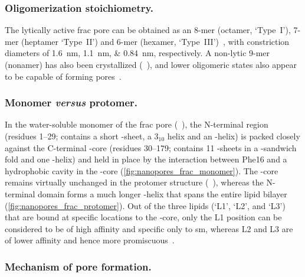 %
\subsubsection{Oligomerization stoichiometry.}
%

The lytically active \gls{frac} pore can be obtained as an 8-mer (octamer, `Type~I'), 7-mer (heptamer
`Type~II') and 6-mer (hexamer, `Type~III')~\cite{Huang-2019}, with constriction diameters of
\SIlist{1.6;1.1;0.84}{\nm}, respectively. A non-lytic 9-mer (nonamer) has also been crystallized
(~\cite{Mechaly-2011}), and lower oligomeric states also appear to be capable of forming
pores~\cite{Rojko-2016}.

%
\subsubsection{Monomer \textit{versus} protomer.}
%

In the water-soluble monomer of the \gls{frac} pore (~\cite{Tanaka-2015}), the N-terminal region
(residues 1--29; contains a short \tb-sheet, a $3_{10}$ helix and an \ta-helix) is packed closely against the
C-terminal \tb-core (residues 30--179; contains 11 \tb-sheets in a \tb-sandwich fold and one \ta-helix) and
held in place by the interaction between Phe16 and a hydrophobic cavity in the \tb-core
(\cref{fig:nanopores_frac_monomer}). The \tb-core remains virtually unchanged in the protomer structure
(~\cite{Tanaka-2015}), whereas the N-terminal domain forms a much longer \ta-helix that spans the
entire lipid bilayer (\cref{fig:nanopores_frac_protomer}). Out of the three lipids (`L1', `L2', and `L3') that
are bound at specific locations to the \tb-core, only the L1 position can be considered to be of high affinity
and specific only to \gls{sm}, whereas L2 and L3 are of lower affinity and hence more
promiscuous~\cite{Tanaka-2015}. 

%
\subsubsection{Mechanism of pore formation.}
%

